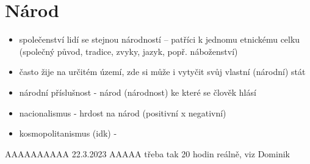 \documentclass{article}
\begin{document}
\section{Národ}
\begin{itemize}
  \item společenství lidí se stejnou národností -- patříci k jednomu etnickému celku (společný původ, tradice, zvyky, jazyk, popř. náboženství)
  \item často žije na určitém území, zde si může i vytyčit svůj vlastní (národní) stát
  \item národní příslušnost - národ (národnost) ke které se člověk hlásí
  \item nacionalismus - hrdost na národ (positivní x negativní)
  \item kosmopolitanismus (idk) - 
\end{itemize}

AAAAAAAAAA 22.3.2023
AAAAA třeba tak 20 hodin reálně, viz Dominik
\end{document}
